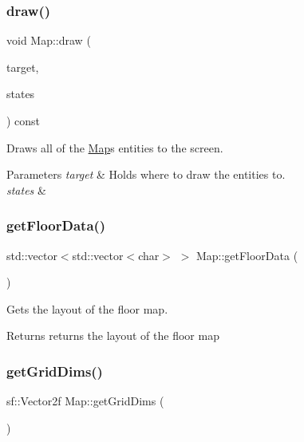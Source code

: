 \subsubsection{\texorpdfstring{draw()}{draw()}}
{\footnotesize\ttfamily void Map\+::draw (\begin{DoxyParamCaption}\item[{sf\+::\+Render\+Target \&}]{target,  }\item[{sf\+::\+Render\+States}]{states }\end{DoxyParamCaption}) const\hspace{0.3cm}{\ttfamily [private]}}



Draws all of the \hyperlink{class_map}{Map}\textquotesingle{}s entities to the screen. 


\begin{DoxyParams}{Parameters}
{\em target} & Holds where to draw the entities to. \\
\hline
{\em states} & \\
\hline
\end{DoxyParams}
\mbox{\label{class_map_aab072e52b2795278fba8c711bb1426cf}} 
\subsubsection{\texorpdfstring{get\+Floor\+Data()}{getFloorData()}}
{\footnotesize\ttfamily std\+::vector$<$std\+::vector$<$char$>$ $>$ Map\+::get\+Floor\+Data (\begin{DoxyParamCaption}{ }\end{DoxyParamCaption})}



Gets the layout of the floor map. 

\begin{DoxyReturn}{Returns}
returns the layout of the floor map 
\end{DoxyReturn}
\mbox{\label{class_map_a8f6919e1bf35cbfd2c14c2278b6c2ea1}} 
\subsubsection{\texorpdfstring{get\+Grid\+Dims()}{getGridDims()}}
{\footnotesize\ttfamily sf\+::\+Vector2f Map\+::get\+Grid\+Dims (\begin{DoxyParamCaption}{ }\end{DoxyParamCaption})}



